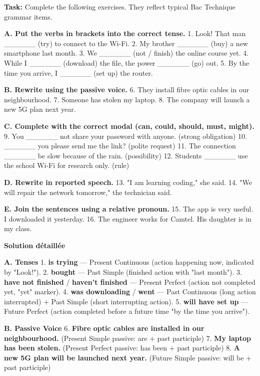 \documentclass[11pt]{article}
\begin{document}
\begin{exoresolu}
\textbf{Task:} Complete the following exercises. They reflect typical Bac Technique grammar items.

\textbf{A. Put the verbs in brackets into the correct tense.}
1. Look! That man \_\_\_\_\_\_ (try) to connect to the Wi-Fi.
2. My brother \_\_\_\_\_\_ (buy) a new smartphone last month.
3. We \_\_\_\_\_\_ (not / finish) the online course yet.
4. While I \_\_\_\_\_\_ (download) the file, the power \_\_\_\_\_\_ (go) out.
5. By the time you arrive, I \_\_\_\_\_\_ (set up) the router.

\textbf{B. Rewrite using the passive voice.}
6. They install fibre optic cables in our neighbourhood.
7. Someone has stolen my laptop.
8. The company will launch a new 5G plan next year.

\textbf{C. Complete with the correct modal (can, could, should, must, might).}
9. You \_\_\_\_\_\_ not share your password with anyone. (strong obligation)
10. \_\_\_\_\_\_ you please send me the link? (polite request)
11. The connection \_\_\_\_\_\_ be slow because of the rain. (possibility)
12. Students \_\_\_\_\_\_ use the school Wi-Fi for research only. (rule)

\textbf{D. Rewrite in reported speech.}
13. "I am learning coding," she said.
14. "We will repair the network tomorrow," the technician said.

\textbf{E. Join the sentences using a relative pronoun.}
15. The app is very useful. I downloaded it yesterday.
16. The engineer works for Camtel. His daughter is in my class.

\tcblower
\textbf{Solution détaillée}

\textbf{A. Tenses}
1. \textbf{is trying} — Present Continuous (action happening now, indicated by "Look!").
2. \textbf{bought} — Past Simple (finished action with "last month").
3. \textbf{have not finished} / \textbf{haven't finished} — Present Perfect (action not completed yet, "yet" marker).
4. \textbf{was downloading} / \textbf{went} — Past Continuous (long action interrupted) + Past Simple (short interrupting action).
5. \textbf{will have set up} — Future Perfect (action completed before a future time "by the time you arrive").

\textbf{B. Passive Voice}
6. \textbf{Fibre optic cables are installed in our neighbourhood.} (Present Simple passive: are + past participle)
7. \textbf{My laptop has been stolen.} (Present Perfect passive: has been + past participle)
8. \textbf{A new 5G plan will be launched next year.} (Future Simple passive: will be + past participle)


\end{exoresolu}
\end{document}
